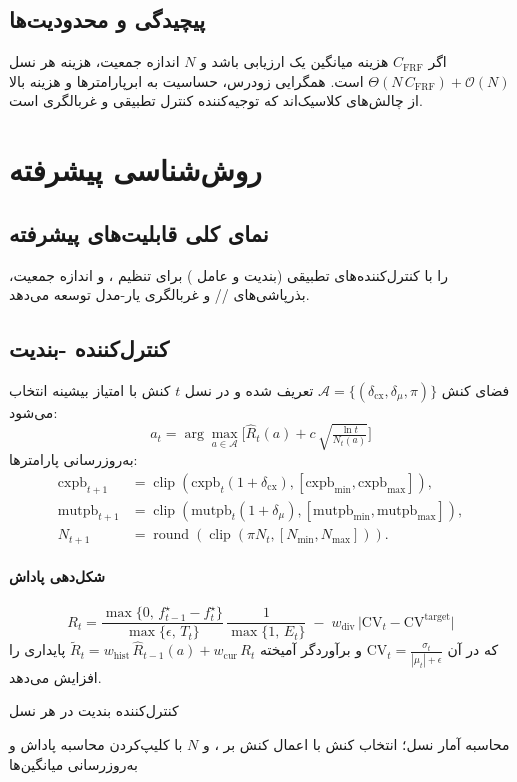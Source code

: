 \subsection{پیچیدگی و محدودیت‌ها}
اگر $C_{\text{FRF}}$ هزینه میانگین یک ارزیابی  باشد و $N$ اندازه جمعیت، هزینه هر نسل $\Theta(N\,C_{\text{FRF}})+\mathcal{O}(N)$ است. همگرایی زودرس، حساسیت به ابرپارامترها و هزینه بالا از چالش‌های کلاسیک‌اند که توجیه‌کننده کنترل تطبیقی و غربالگری است.

\section{روش‌شناسی پیشرفته }
\subsection{نمای کلی قابلیت‌های پیشرفته}
\softwareName{}  را با کنترل‌کننده‌های تطبیقی (بندیت  و عامل ) برای تنظیم ،  و اندازه جمعیت، بذرپاشی‌های // و غربالگری یار-مدل  توسعه می‌دهد.

\subsection{کنترل‌کننده -بندیت}
فضای کنش $\mathcal{A}=\{(\delta_{\text{cx}},\delta_{\mu},\pi)\}$ تعریف شده و در نسل $t$ کنش با امتیاز  بیشینه انتخاب می‌شود:
\begin{equation}\label{Eq.ucb}
 a_t=\arg\max_{a\in\mathcal{A}}\Big[ \hat{R}_t(a)+ c\,\sqrt{\tfrac{\ln t}{N_t(a)}} \Big]
\end{equation}
به‌روزرسانی پارامترها:
\begin{align}
\text{cxpb}_{t+1}&=\operatorname{clip}(\text{cxpb}_t(1+\delta_{\text{cx}}),[\text{cxpb}_{\min},\text{cxpb}_{\max}]),\\
\text{mutpb}_{t+1}&=\operatorname{clip}(\text{mutpb}_t(1+\delta_{\mu}),[\text{mutpb}_{\min},\text{mutpb}_{\max}]),\\
N_{t+1}&=\operatorname{round}(\operatorname{clip}(\pi N_t,[N_{\min},N_{\max}])).
\end{align}
\paragraph{شکل‌دهی پاداش}
\begin{equation}\label{Eq.bandit_reward}
R_t=\frac{\max\{0,\,f^{\star}_{t-1}-f^{\star}_{t}\}}{\max\{\epsilon,\,T_t\}}\,\frac{1}{\max\{1,\,E_t\}}\; -\; w_{\text{div}}\,\big|\mathrm{CV}_t-\mathrm{CV}^{\text{target}}\big|
\end{equation}
که در آن $\mathrm{CV}_t=\tfrac{\sigma_t}{|\mu_t|+\epsilon}$ و برآوردگر آمیخته $\tilde R_t= w_{\text{hist}}\,\hat{R}_{t-1}(a)+w_{\text{cur}}\,R_t$ پایداری را افزایش می‌دهد.
\begin{algorithm}[H]
\caption{کنترل‌کننده بندیت  در هر نسل}
\begin{algorithmic}[1]
\STATE محاسبه آمار نسل؛ انتخاب کنش با 
\STATE اعمال کنش بر ،  و $N$ با کلیپ‌کردن
\STATE محاسبه پاداش و به‌روزرسانی میانگین‌ها
\end{algorithmic}
\end{algorithm}

